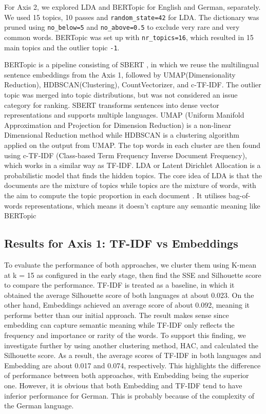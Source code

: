 \documentclass[11pt]{article}
\begin{document}
For Axis 2, we explored LDA and BERTopic for English and German, separately. We used 15 topics, 10 passes and \texttt{random\_state=42} for LDA. The dictionary was pruned using \texttt{no\_below=5} and \texttt{no\_above=0.5} to exclude very rare and very common words. BERTopic was set up with \texttt{nr\_topics=16}, which resulted in 15 main topics and the outlier topic \texttt{-1}. 

BERTopic is a pipeline consisting of SBERT \cite{reimers2019sentence}, in which we reuse the multilingual sentence embeddings from the Axis 1, followed by UMAP(Dimensionality Reduction), HDBSCAN(Clustering), CountVectorizer, and c-TF-IDF. The outlier topic was merged into topic distributions, but was not considered an issue category for ranking. SBERT transforms sentences into dense vector representations and supports multiple languages. UMAP (Uniform Manifold Approximation and Projection for Dimension Reduction) is a non-linear Dimensional Reduction method while HDBSCAN is a clustering algorithm applied on the output from UMAP. The top words in each cluster are then found using c-TF-IDF (Class-based Term Frequency Inverse Document Frequency), which works in a similar way as TF-IDF. LDA or Latent Dirichlet Allocation is a probabilistic model that finds the hidden topics. The core idea of LDA is that the documents are the mixture of topics while topics are the mixture of words, with the aim to compute the topic proportion in each document \cite{LDA_geeksforgeeks}. It utilises bag-of-words representations, which means it doesn’t capture any semantic meaning like BERTopic





\subsection{Results for Axis 1: TF-IDF vs Embeddings}
To evaluate the performance of both approaches, we cluster them using K-mean at k = 15 as configured in the early stage, then find the SSE and Silhouette score to compare the performance. TF-IDF is treated as a baseline, in which it obtained the average Silhouette score of both languages at about 0.023. On the other hand, Embeddings achieved an average score of about 0.092, meaning it performs better than our initial approach. The result makes sense since embedding can capture semantic meaning while TF-IDF only reflects the frequency and importance or rarity of the words. To support this finding, we investigate further by using another clustering method, HAC, and calculated the Silhouette score. As a result, the average scores of TF-IDF in both languages and Embedding are about 0.017 and 0.074, respectively. This highlights the difference of performance between both approaches, with Embedding being the superior one. However, it is obvious that both Embedding and TF-IDF tend to have inferior performance for German. This is probably because of the complexity of the German language.
 
\end{document}
